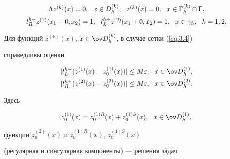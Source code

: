 \begin{equation*} \label{eq.5.7a}


\begin{array}{c}


\La z^{(k)}(x) = 0, \ \ x\in D^{(k)}_h, \ \ z^{(k)}(x) = 0,


\ \ x\in\G^{(k)}_h\cap\G,\\[2mm]


l^{h-}_R z^{(1)}(x_1-0, x_2) = 1, \ \ l^{h+}_L z^{(2)}(x_1+0, x_2) = 1, \ \


x\in\gamma_h, \ \ k=1,2.


\end{array}


\end{equation*}





Для функций $z^{(k)}(x)$, $x\in\od^{(k)}_h$, в случае сетки (\ref{eq.3.4})


справедливы оценки


\begin{equation} \label{eq.5.7b}


\begin{split}


| l^{h-}_L (z^{(1)}(x)-z_0^{(1)}(x))| &\leq M \eps, \ \ x\in \od^{(1)}_h,\\


| l^{h+}_R (z^{(2)}(x)-z_0^{(2)}(x))| &\leq M \eps, \ \ x\in \od^{(2)}_h.


\end{split}


\end{equation}




Здесь


$$


z^{(1)}_0(x)=z^{(1)R}_0(x)+z^{(1)S}_0(x), \ \


x \in \od^{(1)}_h,


$$


функции $z^{(2)}_0(x)$ и $z^{(1)R}_0(x)$, $z^{(1)S}_0(x)$


(регулярная и сингулярная компоненты) --- решения задач


